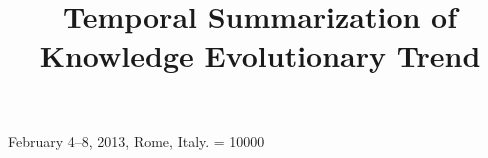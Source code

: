 \documentclass{sig-alternate}
\newcommand{\hide}[1]{} %
\begin{document}
 {February 4--8, 2013, Rome, Italy.}
\widowpenalty = 10000

\title{Temporal Summarization of Knowledge Evolutionary Trend
}

\hide{
\author{
\alignauthor Sen Wu\\
	\affaddr{Department of Computer Science}\\
	\affaddr{Tsinghua University}\\
	\affaddr{Beijing 100084, China}\\
	\email{ronaldosen@gmail.com}
\alignauthor Jimeng Sun\\
	\affaddr{IBM T. J. Watson Research Center}\\
	\affaddr{USA}\\
	\email{jimeng@us.ibm.com}
\alignauthor Jie Tang\\
	\affaddr{Department of Computer Science}\\
	\affaddr{Tsinghua University}\\
	\affaddr{Beijing 100084, China}\\
	\email{jietang@tsinghua.edu.cn}
}
}
\maketitle
\sloppy
%


\vspace{-0.1in}
\vspace{-0.06in}
\vspace{-0.06in}


%
%
%

%

%
%
%
%
%


%
\begin{thebibliography}{10}


\end{thebibliography}

\normalsize
\end{document}
